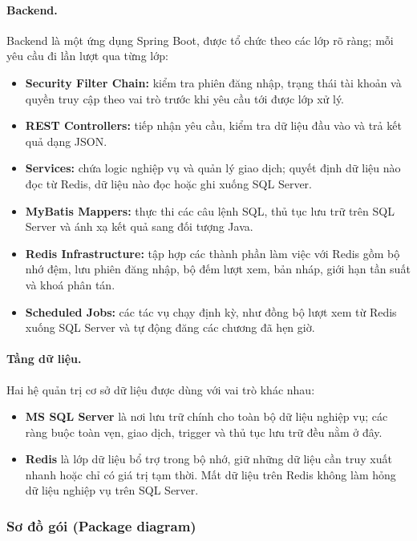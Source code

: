 \paragraph{Backend.} Backend là một ứng dụng Spring Boot, được tổ chức theo các lớp rõ ràng; mỗi yêu cầu đi lần lượt qua từng lớp:
\begin{itemize}
    \item \textbf{Security Filter Chain:} kiểm tra phiên đăng nhập, trạng thái tài khoản và quyền truy cập theo vai trò trước khi yêu cầu tới được lớp xử lý.
    \item \textbf{REST Controllers:} tiếp nhận yêu cầu, kiểm tra dữ liệu đầu vào và trả kết quả dạng JSON.
    \item \textbf{Services:} chứa logic nghiệp vụ và quản lý giao dịch; quyết định dữ liệu nào đọc từ Redis, dữ liệu nào đọc hoặc ghi xuống SQL Server.
    \item \textbf{MyBatis Mappers:} thực thi các câu lệnh SQL, thủ tục lưu trữ trên SQL Server và ánh xạ kết quả sang đối tượng Java.
    \item \textbf{Redis Infrastructure:} tập hợp các thành phần làm việc với Redis gồm bộ nhớ đệm, lưu phiên đăng nhập, bộ đếm lượt xem, bản nháp, giới hạn tần suất và khoá phân tán.
    \item \textbf{Scheduled Jobs:} các tác vụ chạy định kỳ, như đồng bộ lượt xem từ Redis xuống SQL Server và tự động đăng các chương đã hẹn giờ.
\end{itemize}

\paragraph{Tầng dữ liệu.} Hai hệ quản trị cơ sở dữ liệu được dùng với vai trò khác nhau:
\begin{itemize}
    \item \textbf{MS SQL Server} là nơi lưu trữ chính cho toàn bộ dữ liệu nghiệp vụ; các ràng buộc toàn vẹn, giao dịch, trigger và thủ tục lưu trữ đều nằm ở đây.
    \item \textbf{Redis} là lớp dữ liệu bổ trợ trong bộ nhớ, giữ những dữ liệu cần truy xuất nhanh hoặc chỉ có giá trị tạm thời. Mất dữ liệu trên Redis không làm hỏng dữ liệu nghiệp vụ trên SQL Server.
\end{itemize}

\subsubsection{Sơ đồ gói (Package diagram)}
\label{subsubsec:package-diagram}

